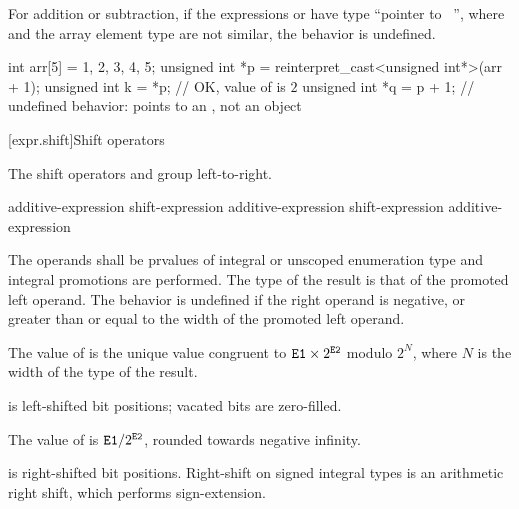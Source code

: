 \pnum
For addition or subtraction, if the expressions  or  have
type ``pointer to \cv{}~'', where  and the array element type
are not similar, the behavior is undefined.
\begin{example}
\begin{codeblock}
int arr[5] = {1, 2, 3, 4, 5};
unsigned int *p = reinterpret_cast<unsigned int*>(arr + 1);
unsigned int k = *p;            // OK, value of  is $2$
unsigned int *q = p + 1;        // undefined behavior:  points to an , not an  object
\end{codeblock}
\end{example}

[expr.shift]{Shift operators}

\pnum
{}%
%
%
%
%
%
The shift operators \tcode{<<} and \tcode{>>} group left-to-right.

%
%
%
%
%
\begin{bnf}
\br
    additive-expression\br
    shift-expression \terminal{<<} additive-expression\br
    shift-expression \terminal{>>} additive-expression
\end{bnf}

The operands shall be prvalues of integral or unscoped enumeration type and integral
promotions are performed. The type of the result is that of the promoted
left operand.
%
The behavior is undefined if the right operand is negative, or greater
than or equal to the width of the promoted left operand.

\pnum
The value of  is the unique value congruent to
$\texttt{\protect E1} \times 2^{\texttt{\protect E2}}$ modulo $2^N$,
where $N$ is the width of the type of the result.
\begin{note}
 is left-shifted  bit positions;
vacated bits are zero-filled.
\end{note}

\pnum
The value of  is $\texttt{\protect E1} / 2^{\texttt{\protect E2}}$,
rounded towards negative infinity.
\begin{note}
 is right-shifted  bit positions.
Right-shift on signed integral types is an arithmetic right shift,
which performs sign-extension.
\end{note}

